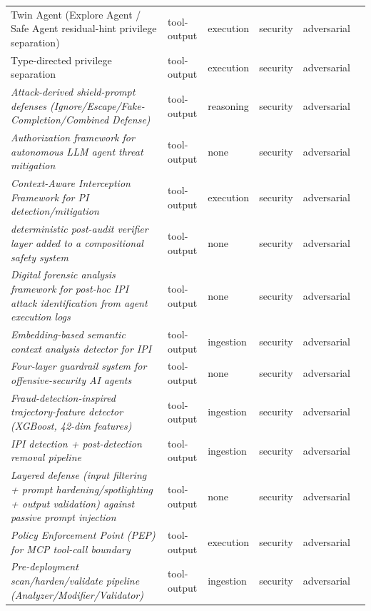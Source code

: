 \begin{longtable}{@{}p{}lllll@{}}
Twin Agent (Explore Agent / Safe Agent residual-hint privilege separation) & tool-output & execution & security & adversarial & \cite{hu-2026-twin} \\
Type-directed privilege separation & tool-output & execution & security & adversarial & \cite{jacob-2025-preventing} \\
\emph{Attack-derived shield-prompt defenses (Ignore/Escape/Fake-Completion/Combined Defense)} & tool-output & reasoning & security & adversarial & \cite{chen-2024-defense} \\
\emph{Authorization framework for autonomous LLM agent threat mitigation} & tool-output & none & security & adversarial & \cite{kota-2025-systemic} \\
\emph{Context-Aware Interception Framework for PI detection/mitigation} & tool-output & execution & security & adversarial & \cite{singh-2026-securing} \\
\emph{deterministic post-audit verifier layer added to a compositional safety system} & tool-output & none & security & adversarial & \cite{zhang-2026-ownerharm} \\
\emph{Digital forensic analysis framework for post-hoc IPI attack identification from agent execution logs} & tool-output & none & security & adversarial & \cite{chernyshev-2024-short} \\
\emph{Embedding-based semantic context analysis detector for IPI} & tool-output & ingestion & security & adversarial & \cite{alamsabi-2026-embeddingbased} \\
\emph{Four-layer guardrail system for offensive-security AI agents} & tool-output & none & security & adversarial & \cite{vilches-2025-cybersecurity} \\
\emph{Fraud-detection-inspired trajectory-feature detector (XGBoost, 42-dim features)} & tool-output & ingestion & security & adversarial & \cite{yu-2026-lowlatency} \\
\emph{IPI detection + post-detection removal pipeline} & tool-output & ingestion & security & adversarial & \cite{chen-2025-indirect} \\
\emph{Layered defense (input filtering + prompt hardening/spotlighting + output validation) against passive prompt injection} & tool-output & none & security & adversarial & \cite{karanjai-2026-context} \\
\emph{Policy Enforcement Point (PEP) for MCP tool-call boundary} & tool-output & execution & security & adversarial & \cite{wang-2026-runtime} \\
\emph{Pre-deployment scan/harden/validate pipeline (Analyzer/Modifier/Validator)} & tool-output & ingestion & security & adversarial & \cite{shukla-2026-data} \\

\end{longtable}
